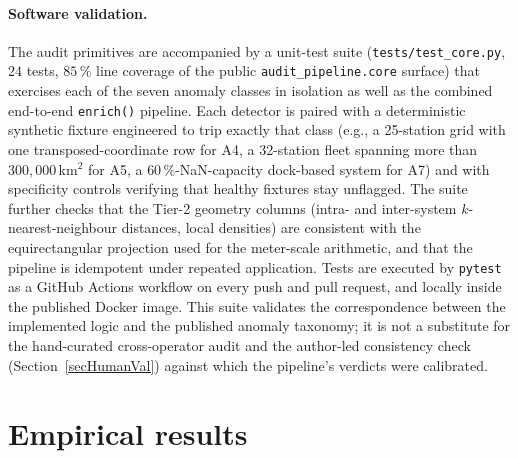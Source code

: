 \documentclass[11pt,a4paper]{article}
\begin{document}
\paragraph{Software validation.}
The audit primitives are accompanied by a unit-test suite
(\texttt{tests/test\_core.py}, $24$ tests, $85\,\%$ line coverage of
the public \texttt{audit\_pipeline.core} surface) that exercises each
of the seven anomaly classes in isolation as well as the combined
end-to-end \texttt{enrich()} pipeline. Each detector is paired with
a deterministic synthetic fixture engineered to trip exactly that
class (e.g., a 25-station grid with one transposed-coordinate row
for A4, a 32-station fleet spanning more than $300{,}000$\,km$^2$
for A5, a $60\,\%$-NaN-capacity dock-based system for A7) and with
specificity controls verifying that healthy fixtures stay
unflagged. The suite further checks that the Tier-2 geometry
columns (intra- and inter-system $k$-nearest-neighbour distances,
local densities) are consistent with the equirectangular projection
used for the meter-scale arithmetic, and that the pipeline is
idempotent under repeated application. Tests are executed by
\texttt{pytest} as a GitHub Actions workflow on every push and pull
request, and locally inside the published Docker image. This suite
validates the correspondence between the implemented logic and the
published anomaly taxonomy; it is not a
substitute for the hand-curated cross-operator audit and the
author-led consistency check (Section~\ref{secHumanVal}) against
which the pipeline's verdicts were calibrated.


\section{Empirical results}\label{secResults}
\end{document}

